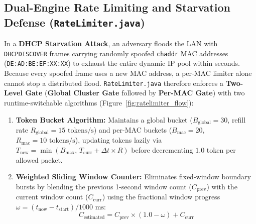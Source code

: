 \documentclass[11pt,a4paper]{article}
\begin{document}
\subsection{Dual-Engine Rate Limiting and Starvation Defense (\texttt{RateLimiter.java})}
In a \textbf{DHCP Starvation Attack}, an adversary floods the LAN with \texttt{DHCPDISCOVER} frames carrying randomly spoofed \texttt{chaddr} MAC addresses (\texttt{DE:AD:BE:EF:XX:XX}) to exhaust the entire dynamic IP pool within seconds. Because every spoofed frame uses a new MAC address, a per-MAC limiter alone cannot stop a distributed flood. \texttt{RateLimiter.java} therefore enforces a \textbf{Two-Level Gate} (\textbf{Global Cluster Gate} followed by \textbf{Per-MAC Gate}) with two runtime-switchable algorithms (Figure~\ref{fig:ratelimiter_flow}):
\begin{enumerate}[leftmargin=2em]
    \item \textbf{Token Bucket Algorithm:} Maintains a global bucket ($B_{\text{global}}=30$, refill rate $R_{\text{global}}=15\text{ tokens/s}$) and per-MAC buckets ($B_{\text{mac}}=20$, $R_{\text{mac}}=10\text{ tokens/s}$), updating tokens lazily via $T_{\text{new}} = \min(B_{\max},\, T_{\text{curr}} + \Delta t \times R)$ before decrementing $1.0$ token per allowed packet.
    \item \textbf{Weighted Sliding Window Counter:} Eliminates fixed-window boundary bursts by blending the previous 1-second window count ($C_{\text{prev}}$) with the current window count ($C_{\text{curr}}$) using the fractional window progress $\omega = (t_{\text{now}} - t_{\text{start}}) / 1000\text{ ms}$:
    \[
    C_{\text{estimated}} = C_{\text{prev}} \times (1.0 - \omega) + C_{\text{curr}}
    \]
\end{enumerate}
\end{document}
